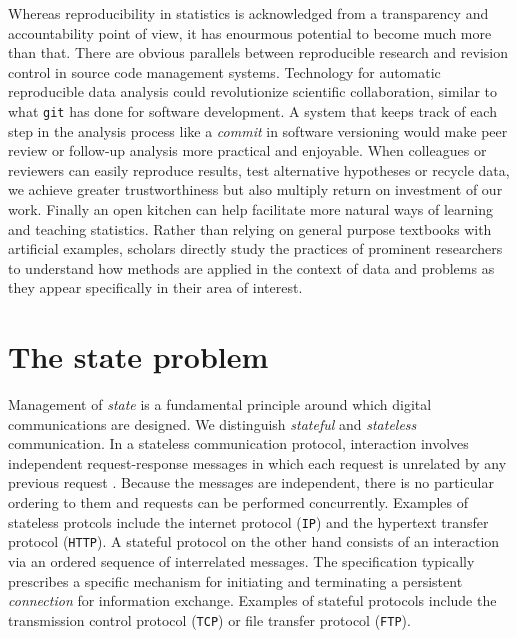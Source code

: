 \documentclass{article}
\newcommand{\HTTP}{\texttt{HTTP}\xspace}
\newcommand{\TCP}{\texttt{TCP}\xspace}
\newcommand{\IP}{\texttt{IP}\xspace}
\begin{document}
Whereas reproducibility in statistics is acknowledged from a transparency and accountability point of view, it has enourmous potential to become much more than that. There are obvious parallels between reproducible research and revision control in source code management systems. Technology for automatic reproducible data analysis could revolutionize scientific collaboration, similar to what \texttt{git} has done for software development. A system that keeps track of each step in the  analysis process like a \emph{commit} in software versioning would make peer review or follow-up analysis more practical and enjoyable. 
When colleagues or reviewers can easily reproduce results, test alternative hypotheses or recycle data, we achieve greater trustworthiness but also multiply return on investment of our work. Finally an open kitchen can help facilitate more natural ways of learning and teaching statistics. Rather than relying on general purpose textbooks with artificial examples, scholars directly study the practices of prominent researchers to understand how methods are applied in the context of data and problems as they appear specifically in their area of interest.


\section{The state problem}

Management of \emph{state} is a fundamental principle around which digital communications are designed. We distinguish \emph{stateful} and \emph{stateless} communication. In a stateless communication protocol, interaction involves independent request-response messages in which each request is unrelated by any previous request \citep{hennessy2012computer}. Because the messages are independent, there is no particular ordering to them and requests can be performed concurrently. Examples of stateless protcols include the internet protocol (\IP) and the hypertext transfer protocol (\HTTP). A stateful protocol on the other hand consists of an interaction via an ordered sequence of interrelated messages. The specification typically prescribes a specific mechanism for initiating and terminating a persistent \emph{connection} for information exchange. Examples of stateful protocols include the transmission control protocol (\TCP) or file transfer protocol (\texttt{FTP}).
\end{document}
